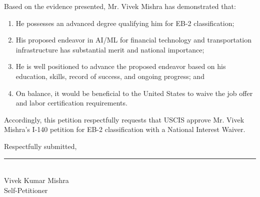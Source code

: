 \documentclass[11pt]{article}
\newcommand{\dr}{Mr. Vivek Mishra }
\newcommand{\drs}{Mr. Vivek Mishra's }
\begin{document}
Based on the evidence presented, \dr has demonstrated that:

\begin{enumerate}
    \item He possesses an advanced degree qualifying him for EB-2 classification;
    \item His proposed endeavor in AI/ML for financial technology and transportation infrastructure has substantial merit and national importance;
    \item He is well positioned to advance the proposed endeavor based on his education, skills, record of success, and ongoing progress; and
    \item On balance, it would be beneficial to the United States to waive the job offer and labor certification requirements.
\end{enumerate}

Accordingly, this petition respectfully requests that USCIS approve \drs I-140 petition for EB-2 classification with a National Interest Waiver.

\vspace{2em}

Respectfully submitted,

\vspace{3em}

\rule{6cm}{0.4pt}\\
Vivek Kumar Mishra\\
Self-Petitioner

\pagebreak


\renewcommand\refname{List of Exhibits}
\end{document}
